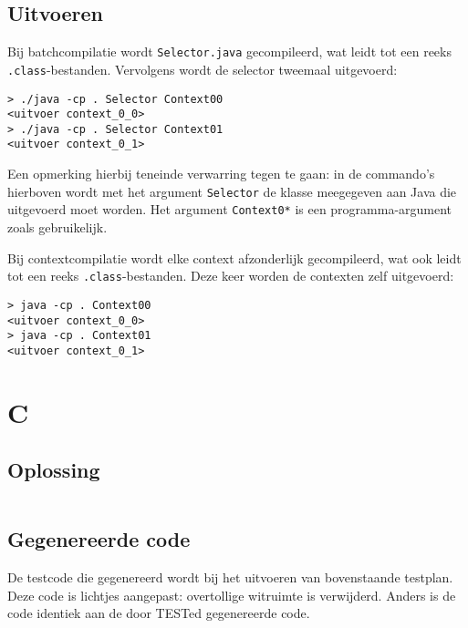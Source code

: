 \inputminted{java}{sources/echo/Selector.java}

\subsection{Uitvoeren}\label{subsec:echo-java-uitvoeren}

Bij batchcompilatie wordt \texttt{Selector.java} gecompileerd, wat leidt tot een reeks \texttt{.class}-bestanden.
Vervolgens wordt de selector tweemaal uitgevoerd:

\begin{verbatim}
> ./java -cp . Selector Context00
<uitvoer context_0_0>
> ./java -cp . Selector Context01
<uitvoer context_0_1>
\end{verbatim}

Een opmerking hierbij teneinde verwarring tegen te gaan: in de commando's hierboven wordt met het argument \texttt{Selector} de klasse meegegeven aan Java die uitgevoerd moet worden.
Het argument \texttt{Context0*} is een programma-argument zoals gebruikelijk.

Bij contextcompilatie wordt elke context afzonderlijk gecompileerd, wat ook leidt tot een reeks \texttt{.class}-bestanden.
Deze keer worden de contexten zelf uitgevoerd:

\begin{verbatim}
> java -cp . Context00
<uitvoer context_0_0>
> java -cp . Context01
<uitvoer context_0_1>
\end{verbatim}

\section{C}\label{sec:echo-c}

\subsection{Oplossing}\label{subsec:echo-c-oplossing}

\inputminted{c}{sources/echo/correct.c}

\subsection{Gegenereerde code}\label{subsec:echo-c-gegenereerde-code}

De testcode die gegenereerd wordt bij het uitvoeren van bovenstaande testplan.
Deze code is lichtjes aangepast: overtollige witruimte is verwijderd.
Anders is de code identiek aan de door TESTed gegenereerde code.

